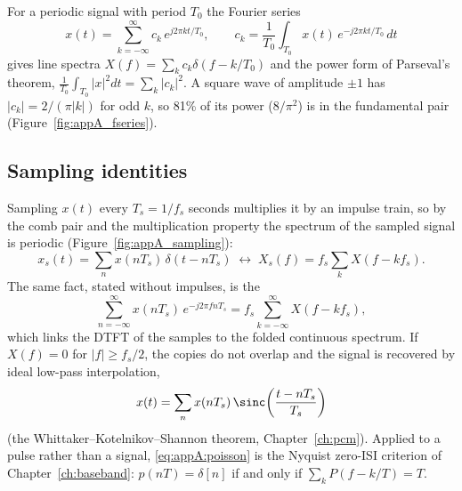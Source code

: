 For a periodic signal with period $T_0$ the Fourier series
\begin{equation}
x(t)=\sum_{k=-\infty}^{\infty}c_k\,e^{j2\pi kt/T_0},\qquad c_k=\frac1{T_0}\int_{T_0}x(t)\,e^{-j2\pi kt/T_0}\,dt
\end{equation}
gives line spectra $X(f)=\sum_k c_k\delta(f-k/T_0)$ and the power form of Parseval's theorem,
$\frac1{T_0}\int_{T_0}|x|^2dt=\sum_k|c_k|^2$. A square wave of amplitude $\pm1$ has
$|c_k|=2/(\pi |k|)$ for odd $k$, so 81\% of its power ($8/\pi^2$) is in the fundamental pair
(Figure~\ref{fig:appA_fseries}).


\subsection{Sampling identities}

Sampling $x(t)$ every $T_s=1/f_s$ seconds multiplies it by an impulse train, so by the comb pair
and the multiplication property the spectrum of the sampled signal is periodic
(Figure~\ref{fig:appA_sampling}):
\begin{equation}
x_s(t)=\sum_n x(nT_s)\,\delta(t-nT_s)\;\leftrightarrow\;X_s(f)=f_s\sum_{k}X(f-kf_s).
\label{eq:appA:sampled}
\end{equation}
The same fact, stated without impulses, is the 
\begin{equation}
\sum_{n=-\infty}^{\infty}x(nT_s)\,e^{-j2\pi fnT_s}=f_s\sum_{k=-\infty}^{\infty}X(f-kf_s),
\label{eq:appA:poisson}
\end{equation}
which links the DTFT of the samples to the folded continuous spectrum. If $X(f)=0$ for
$|f|\ge f_s/2$, the copies do not overlap and the signal is recovered by ideal low-pass
interpolation,
\begin{equation}
x(t)=\sum_{n}x(nT_s)\,\sinc\!\left(\frac{t-nT_s}{T_s}\right)
\label{eq:appA:interp}
\end{equation}
(the Whittaker--Kotelnikov--Shannon theorem, Chapter~\ref{ch:pcm}). Applied to a pulse rather
than a signal, \eqref{eq:appA:poisson} is the Nyquist zero-ISI criterion of
Chapter~\ref{ch:baseband}: $p(nT)=\delta[n]$ if and only if $\sum_kP(f-k/T)=T$.

